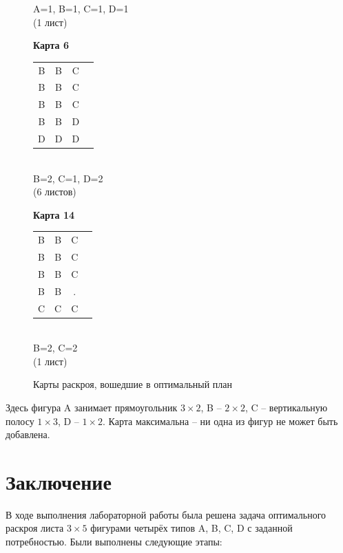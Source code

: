 \begin{figure}[h!]
\begin{minipage}[t]{0.18\textwidth}
\small A=1, B=1, C=1, D=1\\[1mm]
\small (1 лист)
\end{minipage}\hfill
\begin{minipage}[t]{0.18\textwidth}
\centering
\textbf{Карта 6}\\[2mm]
{\ttfamily
\begin{tabular}{cccc}
B & B & C & \\
B & B & C & \\
B & B & C & \\
B & B & D & \\
D & D & D & \\
\end{tabular}
}\\[2mm]
\small B=2, C=1, D=2\\[1mm]
\small (6 листов)
\end{minipage}\hfill
\begin{minipage}[t]{0.18\textwidth}
\centering
\textbf{Карта 14}\\[2mm]
{\ttfamily
\begin{tabular}{cccc}
B & B & C & \\
B & B & C & \\
B & B & C & \\
B & B & . & \\
C & C & C & \\
\end{tabular}
}\\[2mm]
\small B=2, C=2\\[1mm]
\small (1 лист)
\end{minipage}

\caption{Карты раскроя, вошедшие в оптимальный план}
\label{fig:selected-cards}
\end{figure}
Здесь фигура A занимает прямоугольник $3 \times 2$, B -- $2 \times 2$,
C -- вертикальную полосу $1 \times 3$, D -- $1 \times 2$. Карта
максимальна -- ни одна из фигур не может быть добавлена.

\clearpage

\section{Заключение}

В ходе выполнения лабораторной работы была решена задача оптимального
раскроя листа $3 \times 5$ фигурами четырёх типов A, B, C, D с заданной
потребностью. Были выполнены следующие этапы:

